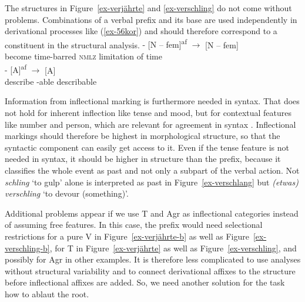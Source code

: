 \documentclass[output=paper
  ,nobabel
  ,draftmode
  ,colorlinks, citecolor=brown
]{langscibook}
\begin{document}
The structures in Figure~\ref{ex-verjährte} and \ref{ex-verschling} do not come without problems. Combinations of a verbal prefix and its base are used independently in derivational processes like (\ref{ex-56kor}) and should therefore correspond to a constituent in the structural analysis.
\eal\label{ex-56kor}
\ex
{} {- [N -- fem]\textsuperscript{af} $\rightarrow$} { [N -- fem]}\\
     {become time-barred}       {\hphantom{-}\textsc{nmlz}                                 } {limitation of time}\\
\ex
{} {- [A]\textsuperscript{af} $\rightarrow$}  [A]\\
     {describe                  } {-able         }                                      describable\\   
\zl

\noindent Information from inflectional marking is furthermore needed in syntax. That does not hold for inherent inflection like tense and mood, but for contextual features like number and person, which are relevant for agreement in syntax \citep[cf.][]{Booij1996}. Inflectional markings should therefore be highest in morphological structure, so that the syntactic component can easily get access to it. Even if the tense feature is not needed in syntax, it should be higher in structure than the prefix, because it classifies the whole event as past and not only a subpart of the verbal action. Not \emph{schling} `to gulp' alone is interpreted as past in Figure~\ref{ex-verschlang} but \emph{(etwas) verschling} `to devour (something)'. 

Additional problems appear if we use T and Agr as inflectional categories instead of assuming free features. In this case, the prefix would need selectional restrictions for a pure V in Figure~\ref{ex-verjährte-b} as well as Figure~\ref{ex-verschling-b}, for T in Figure~\ref{ex-verjährte} as well as Figure~\ref{ex-verschling}, and possibly for Agr in other examples. It is therefore less complicated to use analyses without structural variability and to connect derivational affixes to the structure before inflectional affixes are added. So, we need another solution for the task how to ablaut the root.
\end{document}
